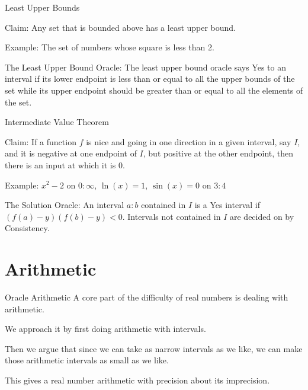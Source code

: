 \documentclass{beamer}
\begin{document}
\begin{frame}{Least Upper Bounds}

Claim:  Any set that is bounded above has a least upper bound. 

Example:  The set of numbers whose square is less than 2. 

The Least Upper Bound Oracle:  The least upper bound oracle says Yes to an interval if its lower endpoint is less than or equal to all the upper bounds of the set while its upper endpoint should be greater than or equal to all the elements of the set. 
    
\end{frame}

\begin{frame}{Intermediate Value Theorem}

Claim: If a function $f$ is nice and going in one direction in a given interval, say $I$, and it is negative at one endpoint of $I$, but positive at the other endpoint, then there is an input at which it is $0$.

Example: $x^2 -2$ on $0:\infty$,  $\ln(x) = 1$, $\sin(x) = 0$ on $3:4$

The Solution Oracle:  An interval $a:b$ contained in $I$ is a Yes interval if $( f(a) - y)(f(b) - y) < 0$. Intervals not contained in $I$ are decided on by Consistency. 
    
\end{frame}


\section{Arithmetic}

\begin{frame}{Oracle Arithmetic}
    A core part of the difficulty of real numbers is dealing with arithmetic. 

    We approach it by first doing arithmetic with intervals. 

    Then we argue that since we can take as narrow intervals as we like, we can make those arithmetic intervals as small as we like. 

    This gives a real number arithmetic with precision about its imprecision. 
\end{frame}
\end{document}
